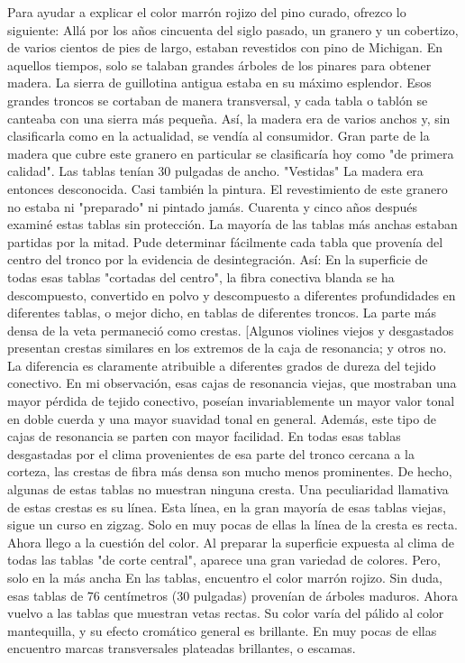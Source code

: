 Para ayudar a explicar el color marrón rojizo del pino curado, ofrezco lo siguiente:
Allá por los años cincuenta del siglo pasado, un granero y un cobertizo, de varios cientos de pies de largo, estaban revestidos con pino de Michigan. En aquellos tiempos, solo se talaban grandes árboles de los pinares para obtener madera. La sierra de guillotina antigua estaba en su máximo esplendor. Esos grandes troncos se cortaban de manera transversal, y cada tabla o tablón se canteaba con una sierra más pequeña. Así, la madera era de varios anchos y, sin clasificarla como en la actualidad, se vendía al consumidor. Gran parte de la madera que cubre este granero en particular se clasificaría hoy como "de primera calidad".
Las tablas tenían 30 pulgadas de ancho. "Vestidas"
La madera era entonces desconocida. Casi también la pintura. El revestimiento de este granero no estaba ni "preparado" ni pintado jamás. Cuarenta y cinco años después examiné estas tablas sin protección. La mayoría de las tablas más anchas estaban partidas por la mitad. Pude determinar fácilmente cada tabla que provenía del centro del tronco por la evidencia de desintegración. Así: En la superficie de todas esas tablas "cortadas del centro", la fibra conectiva blanda se ha descompuesto, convertido en polvo y descompuesto a diferentes profundidades en diferentes tablas, o mejor dicho, en tablas de diferentes troncos. La parte más densa de la veta permaneció como crestas. [Algunos violines viejos y desgastados presentan crestas similares en los extremos de la caja de resonancia; y otros no. La diferencia es claramente atribuible a diferentes grados de dureza del tejido conectivo. En mi observación, esas cajas de resonancia viejas, que mostraban una mayor pérdida de tejido conectivo, poseían invariablemente un mayor valor tonal en doble cuerda y una mayor suavidad tonal en general. Además, este tipo de cajas de resonancia se parten con mayor facilidad.
En todas esas tablas desgastadas por el clima provenientes de esa parte del tronco cercana a la corteza, las crestas de fibra más densa son mucho menos prominentes. De hecho, algunas de estas tablas no muestran ninguna cresta. Una peculiaridad llamativa de estas crestas es su línea. Esta línea, en la gran mayoría de esas tablas viejas, sigue un curso en zigzag. Solo en muy pocas de ellas la línea de la cresta es recta. Ahora llego a la cuestión del color. Al preparar la superficie expuesta al clima de todas las tablas "de corte central", aparece una gran variedad de colores. Pero, solo en la más ancha
En las tablas, encuentro el color marrón rojizo. Sin duda, esas tablas de 76 centímetros (30 pulgadas) provenían de árboles maduros. Ahora vuelvo a las tablas que muestran vetas rectas. Su color varía del pálido al color mantequilla, y su efecto cromático general es brillante. En muy pocas de ellas encuentro marcas transversales plateadas brillantes, o escamas.
